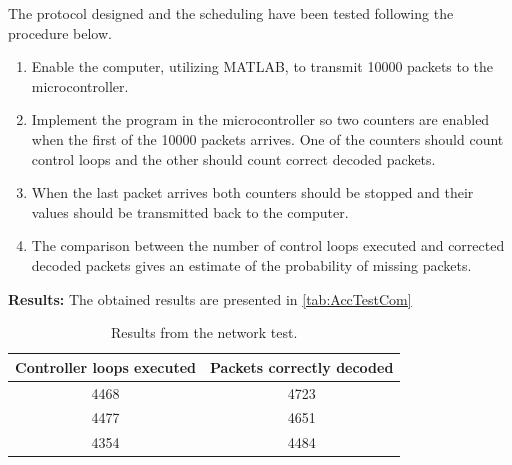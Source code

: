The protocol designed and the scheduling have been tested following the procedure below.
\begin{enumerate}
	\item Enable the computer, utilizing MATLAB, to transmit 10000 packets to the microcontroller.
    \item Implement the program in the microcontroller so two counters are enabled when the first of the 10000 packets arrives. One of the counters should count control loops and the other should count correct decoded packets.
	\item When the last packet arrives both counters should be stopped and their values should be transmitted back to the computer. 
	\item The comparison between the number of control loops executed and corrected decoded packets gives an estimate of the probability of missing packets.
\end{enumerate} 

\textbf{Results:}
The obtained results are presented in \autoref{tab:AccTestCom}
\begin{table}[]
    \centering
    \label{tab:AccTestCom}
    \begin{tabular}{|c|c|}
        \hline
       Controller loops executed  & Packets correctly decoded \\ \hline
       4468 &  4723\\ \hline
       4477 &  4651\\ \hline
       4354 &  4484\\ \hline
    \end{tabular}
    \caption{Results from the network test.}
\end{table}

